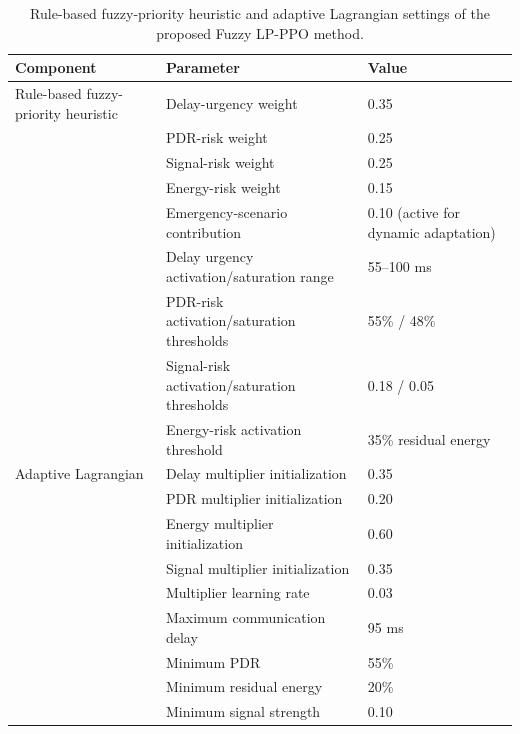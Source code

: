 \begin{table}[!t]
\caption{Rule-based fuzzy-priority heuristic and adaptive Lagrangian settings of the proposed Fuzzy LP-PPO method.}
\label{tab:fuzzy_lagrangian_settings}
\centering
\small
\begin{tabular}{@{}lll@{}}
\toprule
Component & Parameter & Value \\
\midrule
Rule-based fuzzy-priority heuristic & Delay-urgency weight & 0.35 \\
& PDR-risk weight & 0.25 \\
& Signal-risk weight & 0.25 \\
& Energy-risk weight & 0.15 \\
& Emergency-scenario contribution & 0.10 (active for dynamic adaptation) \\
& Delay urgency activation/saturation range & 55--100 ms \\
& PDR-risk activation/saturation thresholds & 55\% / 48\% \\
& Signal-risk activation/saturation thresholds & 0.18 / 0.05 \\
& Energy-risk activation threshold & 35\% residual energy \\
Adaptive Lagrangian & Delay multiplier initialization & 0.35 \\
& PDR multiplier initialization & 0.20 \\
& Energy multiplier initialization & 0.60 \\
& Signal multiplier initialization & 0.35 \\
& Multiplier learning rate & 0.03 \\
& Maximum communication delay & 95 ms \\
& Minimum PDR & 55\% \\
& Minimum residual energy & 20\% \\
& Minimum signal strength & 0.10 \\
\bottomrule
\end{tabular}
\end{table}
